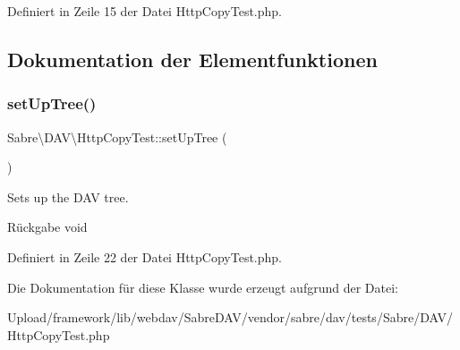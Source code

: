 Definiert in Zeile 15 der Datei Http\+Copy\+Test.\+php.



\subsection{Dokumentation der Elementfunktionen}
\mbox{\label{class_sabre_1_1_d_a_v_1_1_http_copy_test_aa1b891fcf2e616ce62273fd4fa173a90}} 
\subsubsection{\texorpdfstring{set\+Up\+Tree()}{setUpTree()}}
{\footnotesize\ttfamily Sabre\textbackslash{}\+D\+A\+V\textbackslash{}\+Http\+Copy\+Test\+::set\+Up\+Tree (\begin{DoxyParamCaption}{ }\end{DoxyParamCaption})}

Sets up the D\+AV tree.

\begin{DoxyReturn}{Rückgabe}
void 
\end{DoxyReturn}


Definiert in Zeile 22 der Datei Http\+Copy\+Test.\+php.



Die Dokumentation für diese Klasse wurde erzeugt aufgrund der Datei\+:\begin{DoxyCompactItemize}
\item 
Upload/framework/lib/webdav/\+Sabre\+D\+A\+V/vendor/sabre/dav/tests/\+Sabre/\+D\+A\+V/Http\+Copy\+Test.\+php\end{DoxyCompactItemize}
